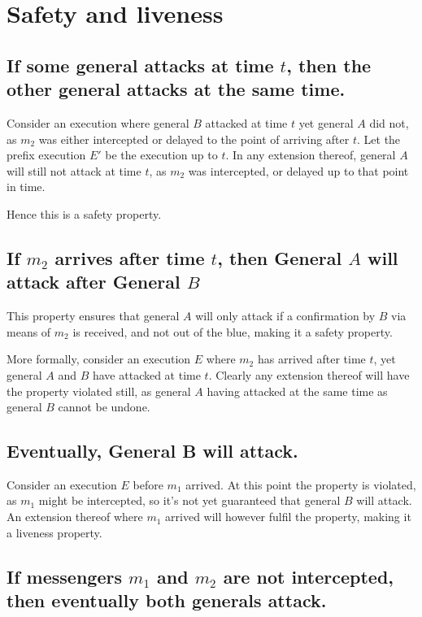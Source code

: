 \documentclass[a4paper]{scrreprt}
\begin{document}
\section{Safety and liveness}
\label{seq:safety_liveness}

\subsection{If some general attacks at time $t$, then the other general attacks at the same time.}
\label{seq:safety_property}

Consider an execution where general $B$ attacked at time $t$ yet general $A$
did not, as $m_2$ was either intercepted or delayed to the point of arriving
after $t$. Let the prefix execution $E'$ be the execution up to $t$. In any
extension thereof, general $A$ will still not attack at time $t$, as $m_2$ was
intercepted, or delayed up to that point in time.

Hence this is a safety property.

\subsection{If $m_2$ arrives after time $t$, then General $A$ will attack after General $B$}
\label{seq:no_unconfirmed_attack_safety}

This property ensures that general $A$ will only attack if a confirmation by
$B$ via means of $m_2$ is received, and not out of the blue, making it a safety
property.

More formally, consider an execution $E$ where $m_2$ has arrived after time
$t$, yet general $A$ and $B$ have attacked at time $t$. Clearly any extension
thereof will have the property violated still, as general $A$ having attacked
at the same time as general $B$ cannot be undone.

\subsection{Eventually, General B will attack.}

Consider an execution $E$ before $m_1$ arrived. At this point the property is
violated, as $m_1$ might be intercepted, so it's not yet guaranteed that
general $B$ will attack. An extension thereof where $m_1$ arrived will however
fulfil the property, making it a liveness property.

\subsection{If messengers $m_1$ and $m_2$ are not intercepted, then eventually both generals attack.}
\label{seq:liveness_property}
\end{document}
